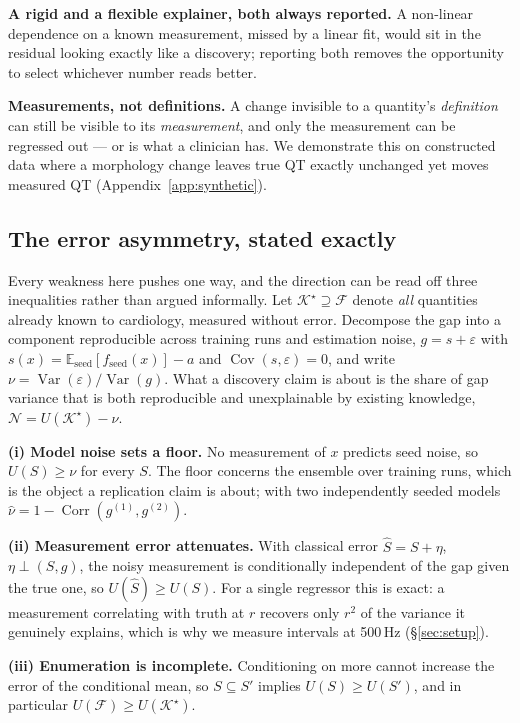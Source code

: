 \documentclass{article}
\begin{document}
\textbf{A rigid and a flexible explainer, both always reported.} A non-linear
dependence on a known measurement, missed by a linear fit, would sit in the
residual looking exactly like a discovery; reporting both removes the
opportunity to select whichever number reads better.

\textbf{Measurements, not definitions.} A change invisible to a quantity's
\emph{definition} can still be visible to its \emph{measurement}, and only the
measurement can be regressed out --- or is what a clinician has. We demonstrate
this on constructed data where a morphology change leaves true QT exactly
unchanged yet moves measured QT (Appendix~\ref{app:synthetic}).

\subsection{The error asymmetry, stated exactly}
\label{sec:asymmetry}

Every weakness here pushes one way, and the direction can be read off three
inequalities rather than argued informally. Let
$\mathcal{K}^\star \supseteq \mathcal{F}$ denote \emph{all} quantities already
known to cardiology, measured without error. Decompose the gap into a component
reproducible across training runs and estimation noise, $g = s + \varepsilon$
with $s(x) = \mathbb{E}_{\text{seed}}[f_{\text{seed}}(x)] - a$ and
$\operatorname{Cov}(s,\varepsilon) = 0$, and write
$\nu = \operatorname{Var}(\varepsilon)/\operatorname{Var}(g)$. What a discovery
claim is about is the share of gap variance that is both reproducible and
unexplainable by existing knowledge, $\mathcal{N} = U(\mathcal{K}^\star) - \nu$.

\textbf{(i) Model noise sets a floor.} No measurement of $x$ predicts seed
noise, so $U(S) \ge \nu$ for every $S$. The floor concerns the ensemble over
training runs, which is the object a replication claim is about; with two
independently seeded models
$\hat\nu = 1 - \operatorname{Corr}(g^{(1)}, g^{(2)})$.

\textbf{(ii) Measurement error attenuates.} With classical error
$\hat{S} = S + \eta$, $\eta \perp (S,g)$, the noisy measurement is conditionally
independent of the gap given the true one, so $U(\hat{S}) \ge U(S)$. For a
single regressor this is exact: a measurement correlating with truth at $r$
recovers only $r^2$ of the variance it genuinely explains, which is why we
measure intervals at 500\,Hz (\S\ref{sec:setup}).

\textbf{(iii) Enumeration is incomplete.} Conditioning on more cannot increase
the error of the conditional mean, so $S \subseteq S'$ implies $U(S) \ge U(S')$,
and in particular $U(\mathcal{F}) \ge U(\mathcal{K}^\star)$.
\end{document}
